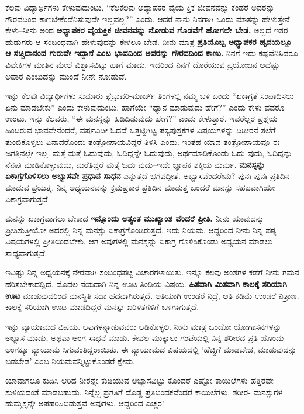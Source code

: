 ಕೆಲವು ವಿದ್ಯಾರ್ಥಿಗಳು ಕೇಳುವುದುಂಟು, “ಕೆಲಕೆಲವು ಅಧ್ಯಾಪಕರ ವೈಯ ಕ್ತಿಕ ಜೀವನವನ್ನು ಕಂಡರೆ ಅವರನ್ನು ಗೌರವದಿಂದ ಕಾಣಬೇಕೆಂದೆನಿಸುವುದೇ ಇಲ್ಲವಲ್ಲ?” ಎಂದು. ಆದರೆ ನಾನು ನಿನಗಾಗಿ ಒಂದು ಮಾತನ್ನು ಹೇಳುತ್ತೇನೆ ಕೇಳು–ನೀನು ಅಂಥ \textbf{ಅಧ್ಯಾಪಕರ ವೈಯಕ್ತಿಕ ಜೀವನವನ್ನು ನೋಡುವ ಗೊಡವೆಗೆ ಹೋಗಲೇ ಬೇಡ.} ಅಲ್ಲದೆ ಇತರ ಹುಡುಗರು ಆ ಸಂಬಂಧವಾಗಿ ಹೇಳುವುದನ್ನು ಕೇಳಲೂ ಬೇಡ. ನೀನು ಮಾತ್ರ \textbf{ಪ್ರತಿಯೊಬ್ಬ ಅಧ್ಯಾಪಕರ ಹೃದಯಲ್ಲೂ ಆ ಸಚ್ಚಿದಾನಂದ ಗುರುವೇ ಇದ್ದಾನೆ ಎಂಬ ಭಾವದಿಂದ ಅವರನ್ನು ಗೌರವದಿಂದ ಕಾಣು.} ನಿನಗೆ ಇದು ಕಷ್ಟವೆನಿಸಿದರೂ ವಿವೇಕಿಗಳ ಮಾತಿನ ಮೇಲೆ ವಿಶ್ವಾಸವಿಟ್ಟು ಹಾಗೆ ಮಾಡು. ಇದರಿಂದ ನಿನಗೆ ದೊರೆಯುವ ಪ್ರಯೋಜನ ಅದೆಷ್ಟು ಅಪಾರ ಎಂಬುದನ್ನು ಮುಂದೆ ನೀನೇ ನೋಡುವೆ.

ಇನ್ನು ಕೆಲವು ವಿದ್ಯಾರ್ಥಿಗಳು ಸುಮಾರು ಫೆಬ್ರುವರಿ-ಮಾರ್ಚ್ ತಿಂಗಳಲ್ಲಿ ನಮ್ಮ ಬಳಿ ಬಂದು “ಏಕಾಗ್ರತೆ ಸಂಪಾದಿಸಲು ಏನು ಮಾಡಬೇಕು” ಎಂದು ಕೇಳುವುದುಂಟು. ಹಾಗೆಯೇ “ಧ್ಯಾನ ಮಾಡುವುದು ಹೇಗೆ?” ಎಂದು ಕೇಳು ವವರೂ ಉಂಟು. ಇನ್ನು ಕೆಲವರು, “ಈ ಮನಸ್ಸನ್ನು ಹಿಡಿದಿಡುವುದು ಹೇಗೆ?” ಎಂದು ಕೇಳುತ್ತಾರೆ. ಇವರೆಲ್ಲರ ಪ್ರಶ್ನೆಯ ಹಿಂದಿರುವ ಭಾವವೇನೆಂದರೆ, ವರ್ಷವಿಡೀ ಓದದೆ ಒತ್ತಟ್ಟಿಗಿಟ್ಟ ಪಠ್ಯಪುಸ್ತಕಗಳ ವಿಷಯಗಳನ್ನು ದಿಢೀರನೆ ತಲೆಗೆ ತುಂಬಿಕೊಳ್ಳಲು ಏನಾದರೊಂದು ತಂತ್ರೋಪಾಯವಿದ್ದರೆ ತಿಳಿಸಿ ಎಂದು. ಇಂತಹ ಯಾವ ತಂತ್ರೋಪಾಯವೂ ಈ ಜಗತ್ತಿನಲ್ಲೇ ಇಲ್ಲ. ಮತ್ತೆ ಮತ್ತೆ ಓದುವುದು, ಓದಿದ್ದನ್ನೇ ಓದುವುದು, ಅರ್ಥಮಾಡಿಕೊಂಡು ಓದು ವುದು, ಓದಿದ್ದನ್ನು ನೆನಪು ಮಾಡಿಕೊಳ್ಳುವುದು, ಮರೆತಿದ್ದರೆ ಮತ್ತೆ ಓದು ವುದು–ಇದೇ ಜ್ಞಾಪಕ ಶಕ್ತಿಯ ಮರ್ಮ. \textbf{ಮನಸ್ಸನ್ನು ಏಕಾಗ್ರಗೊಳಿಸಲು ಅಭ್ಯಾಸವೇ ಪ್ರಧಾನ ಸಾಧನ} ಎನ್ನುತ್ತದೆ ಭಗವದ್ಗೀತೆ. ಅಭ್ಯಾಸವೆಂದರೇನು? ಪುನಃ ಪುನಃ ಪ್ರತಿದಿನ ಮಾಡುವ ಪ್ರಯತ್ನ. ನಿನ್ನ ಅಧ್ಯಯನವನ್ನು ಕ್ರಮಪ್ರಕಾರ ಪ್ರತಿದಿನ ಮಾಡುತ್ತ ಬಂದರೆ ಮನಸ್ಸು ಸಹಜವಾಗಿಯೇ ಏಕಾಗ್ರವಾಗುತ್ತದೆ.

ಮನಸ್ಸು ಏಕಾಗ್ರವಾಗಲು ಬೇಕಾದ \textbf{ಇನ್ನೊಂದು ಅತ್ಯಂತ ಮುಖ್ಯಾಂಶ ವೆಂದರೆ ಪ್ರೀತಿ.} ನೀನು ಯಾವುದನ್ನು ಪ್ರೀತಿಸುತ್ತೀಯೋ ಅದರಲ್ಲಿ ನಿನ್ನ ಮನಸ್ಸು ಏಕಾಗ್ರಗೊಂಡಿರುತ್ತದೆ. ಇದು ನಿಯಮ. ಆದ್ದರಿಂದ ನೀನು ನಿನ್ನ ಪಠ್ಯ ವಿಷಯಗಳಲ್ಲಿ ಪ್ರೀತಿಯಿಡಬೇಕು. ಆಗ ಅವುಗಳಲ್ಲಿ ಮನಸ್ಸನ್ನು ಏಕಾಗ್ರ ಗೊಳಿಸಿಕೊಂಡು ಅಧ್ಯಯನ ಮಾಡಲು ಸಾಧ್ಯವಾಗುತ್ತದೆ. 

ಇವಿಷ್ಟು ನಿನ್ನ ಅಧ್ಯಯನಕ್ಕೆ ನೇರವಾಗಿ ಸಂಬಂಧಪಟ್ಟ ವಿಚಾರಗಳಾಯಿತು. ಇನ್ನೂ ಕೆಲವು ಅಂಶಗಳ ಕಡೆಗೆ ನೀನು ಗಮನ ಹರಿಸಬೇಕಾದದ್ದಿದೆ. ಮೊದಲ ನೆಯದಾಗಿ ನಿನ್ನ ಊಟ ತಿಂಡಿಯ ವಿಷಯ. \textbf{ಹಿತವಾಗಿ ಮಿತವಾಗಿ ಕಾಲಕ್ಕೆ ಸರಿಯಾಗಿ ಊಟ} ಮಾಡುವುದರಿಂದ ಮನಸ್ಥಿತಿ ಸದಾ ಹದವಾಗಿರುತ್ತದೆ. ಅತಿಯಾಗಿ ಉಂಡರೆ ನಿದ್ರೆ, ಅತಿ ಕಡಿಮೆ ಉಂಡರೆ ನಿತ್ರಾಣ. ಕಾಲಕ್ಕೆ ಸರಿಯಾಗಿ ಊಟ ಮಾಡದಿದ್ದರೆ ಮನಸ್ಸು ಏರಿಳಿತಗಳಿಗೆ ಒಳಗಾಗುತ್ತದೆ.

ಇನ್ನು ವ್ಯಾಯಾಮದ ವಿಷಯ. ಆಟಗಳನ್ನಾಡುವವರು ಆಡಿಕೊಳ್ಳಲಿ. ನೀನು ಮಾತ್ರ ಒಂದೋ ಯೋಗಾಸನಗಳನ್ನು ಅಭ್ಯಾಸ ಮಾಡು, ಅಥವಾ ಅಂಗ ಸಾಧನೆ ಮಾಡು. ಕೇವಲ ಮುಕ್ಕಾಲು ಗಂಟೆಯಲ್ಲಿ ನಿನ್ನ ಶರೀರದ ಪ್ರತಿ ಯೊಂದು ಅಂಗಕ್ಕೂ ವ್ಯಾಯಾಮ ಸಿಗುವಂತಿದ್ದರಾಯಿತು. ಈ ವ್ಯಾಯಾಮದ ವಿಷಯದಲ್ಲಿ ‘ಹೆಚ್ಚಿಗೆ ಮಾಡಬೇಡ, ಮಾಡುವುದನ್ನು ಬಿಡಬೇಡ’ ಎಂಬ ನಿಯಮವನ್ನಿಟ್ಟುಕೊಂಡರೆ ಕ್ಷೇಮ.

ಯಾವಾಗಲೂ ಕುದಿಸಿ ಆರಿದ ನೀರನ್ನೇ ಕುಡಿಯುವ ಅಭ್ಯಾಸವಿಟ್ಟು ಕೊಂಡರೆ ಎಷ್ಟೋ ಕಾಯಿಲೆಗಳು ಹತ್ತಿರವೇ ಸುಳಿಯದಂತೆ ಮಾಡಬಹುದು. ನಿನ್ನೆಲ್ಲ ಪ್ರಗತಿಗೆ ದೊಡ್ಡ ಪ್ರತಿಬಂಧಕವೆಂದರೆ ಕಾಯಿಲೆಗಳು. ಶರೀರ- ಮನಸ್ಸುಗಳ ಹುಮ್ಮಸ್ಸನ್ನೇ ಅಪಹರಿಸಿಬಿಡುತ್ತವೆ ಅವುಗಳು. ಆದ್ದರಿಂದ ಎಚ್ಚರ!


